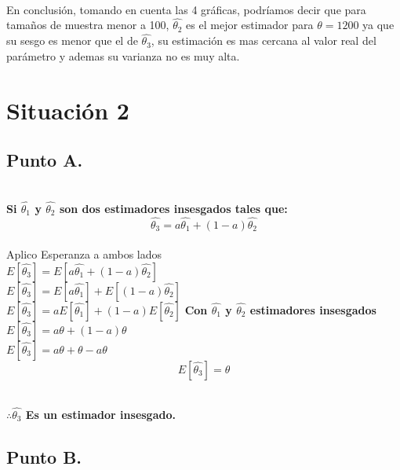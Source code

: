 \documentclass[letterpaper,12pt,onecolumn,titlepage]{article}
\begin{document}
~\\ En conclusi\'{o}n, tomando en cuenta las 4 gr\'{a}ficas, podr\'{i}amos decir que para tama\~{n}os de muestra menor a 100, $\hat{\theta_2}$ es el mejor estimador para $\theta=1200$ ya que su sesgo es menor que el de $\hat{\theta_3}$, su estimaci\'{o}n es mas cercana al valor real del par\'{a}metro y ademas su varianza no es muy alta. 


\pagebreak \section{Situaci\'{o}n 2}
\subsection{Punto A.}
~\\\textbf{Si $\hat{\theta_1}$ y $\hat{\theta_2}$ son dos estimadores insesgados tales que:
~\\$$\hat{\theta_3}=a{\hat{\theta_1}}+(1-a){\hat{\theta_2}}$$}
~\\ Aplico Esperanza a ambos lados 
~\\ $E[\hat{\theta_3}] = E[a{\hat{\theta_1}}+(1-a){\hat{\theta_2}}]$
~\\ $E[\hat{\theta_3}] = E[a{\hat{\theta_1}}]+E[(1-a){\hat{\theta_2}}]$
~\\ $E[\hat{\theta_3}] = aE[{\hat{\theta_1}}]+(1-a)E[{\hat{\theta_2}}]$ \textbf{Con $\hat{\theta_1}$ y $\hat{\theta_2}$ estimadores insesgados}\
~\\ $E[\hat{\theta_3}] = a{\theta} + (1-a){\theta}$
~\\ $E[\hat{\theta_3}] = a{\theta} + {\theta} - a{\theta}$
~\\ $$E[\hat{\theta_3}]={\theta}$$

~\\\textbf{$\therefore \hat{\theta_3}$ Es un estimador insesgado.} 
 


\subsection{Punto B.} 
\end{document}
